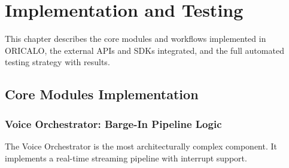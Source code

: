 \chapter{Implementation and Testing}
\label{ch:implementation-testing}

This chapter describes the core modules and workflows implemented in ORICALO, the external APIs and SDKs integrated, and the full automated testing strategy with results.

\section{Core Modules Implementation}

\subsection{Voice Orchestrator: Barge-In Pipeline Logic}

The Voice Orchestrator is the most architecturally complex component. It implements a real-time streaming pipeline with interrupt support.


